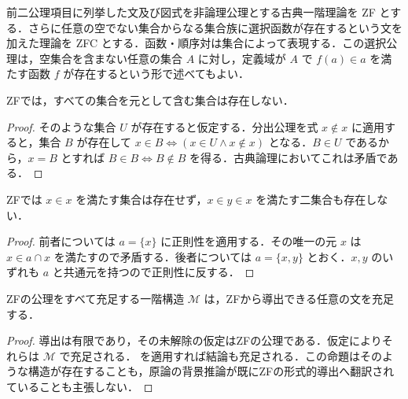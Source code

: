 \begin{defn}[ZF及びZFC]
前二公理項目に列挙した文及び図式を非論理公理とする古典一階理論を ZF とする．さらに任意の空でない集合からなる集合族に選択函数が存在するという文を加えた理論を ZFC とする．函数・順序対は集合によって表現する．この選択公理は，空集合を含まない任意の集合 $A$ に対し，定義域が $A$ で $f(a)\in a$ を満たす函数 $f$ が存在するという形で述べてもよい．
\end{defn}
\begin{prop}[無制限内包の否定]
ZFでは，すべての集合を元として含む集合は存在しない．
\end{prop}
\begin{proof}
そのような集合 $U$ が存在すると仮定する．分出公理を式 $x\notin x$ に適用すると，集合 $B$ が存在して $x\in B\Leftrightarrow(x\in U\land x\notin x)$ となる．$B\in U$ であるから，$x=B$ とすれば $B\in B\Leftrightarrow B\notin B$ を得る．古典論理においてこれは矛盾である．
\end{proof}
\begin{prop}[正則性の帰結]
ZFでは $x\in x$ を満たす集合は存在せず，$x\in y\in x$ を満たす二集合も存在しない．
\end{prop}
\begin{proof}
前者については $a=\{x\}$ に正則性を適用する．その唯一の元 $x$ は $x\in a\cap x$ を満たすので矛盾する．後者については $a=\{x,y\}$ とおく．$x,y$ のいずれも $a$ と共通元を持つので正則性に反する．
\end{proof}
\begin{prop}[形式理論と背景推論の区別]
ZFの公理をすべて充足する一階構造 $\mathcal M$ は，ZFから導出できる任意の文を充足する．
\end{prop}
\begin{proof}
導出は有限であり，その未解除の仮定はZFの公理である．仮定によりそれらは $\mathcal M$ で充足される． を適用すれば結論も充足される．この命題はそのような構造が存在することも，原論の背景推論が既にZFの形式的導出へ翻訳されていることも主張しない．
\end{proof}

